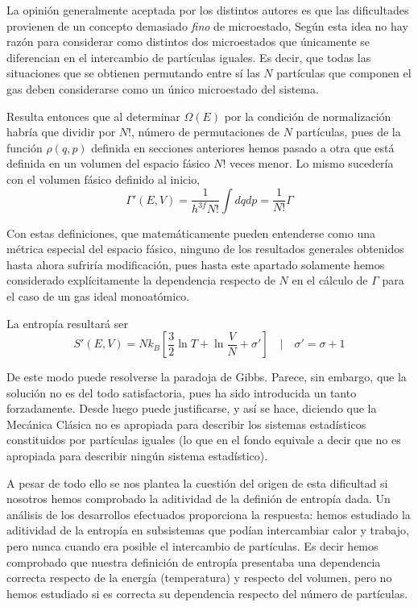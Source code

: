 La opinión generalmente aceptada por los distintos autores es que las dificultades provienen de un concepto demasiado \emph{fino} de microestado, Según esta idea no hay razón para considerar como distintos dos microestados que únicamente se diferencian en el intercambio de partículas iguales. 
Es decir, que todas las situaciones que se obtienen permutando entre sí las $N$ partículas que componen el gas deben considerarse como un único microestado del sistema.

Resulta entonces que al determinar $\Omega(E)$ por la condición de normalización habría que dividir por $N!$, número de permutaciones de $N$ partículas, pues de la función $\rho(q, p)$ definida en secciones anteriores hemos pasado a otra que está definida en un volumen del espacio fásico $N!$ veces menor. Lo mismo sucedería con el volumen fásico definido al inicio,
\begin{equation}
	\Gamma ' (E,V) = \frac{1}{h^{3f}N!} \int dqdp = \frac{1}{N!}\Gamma
\end{equation}

Con estas definiciones, que matemáticamente pueden entenderse como una métrica especial del espacio fásico, ninguno de los resultados generales obtenidos hasta ahora sufriría modificación, pues hasta este apartado solamente hemos considerado explícitamente la dependencia respecto de $N$ en el cálculo de $\Gamma$ para el caso de un gas ideal monoatómico.

La entropía resultará ser
\begin{equation}
	S'(E, V) = N k_B \left[ \frac{3}{2}\ln T +\ln \frac{V}{N} + \sigma' \right] \quad | \quad \sigma' = \sigma + 1
\end{equation}

De este modo puede resolverse la paradoja de Gibbs. Parece, sin embargo, que la solución no es del todo satisfactoria, pues ha sido introducida un tanto forzadamente.
Desde luego puede justificarse, y así se hace, diciendo que la Mecánica Clásica no es apropiada para describir los sistemas estadísticos constituidos por partículas iguales (lo que en el fondo equivale a decir que no es apropiada para describir ningún sistema estadístico).

A pesar de todo ello se nos plantea la cuestión del origen de esta dificultad si nosotros hemos comprobado la aditividad de la definión de entropía dada. 
Un análisis de los desarrollos efectuados proporciona la respuesta: hemos estudiado la aditividad de la entropía en subsistemas que podían intercambiar calor y trabajo, pero nunca cuando era posible el intercambio de partículas.
Es decir hemos comprobado que nuestra definición de entropía presentaba una dependencia correcta respecto de la energía (temperatura) y respecto del volumen, pero no hemos estudiado si es correcta su dependencia respecto del número de partículas.

